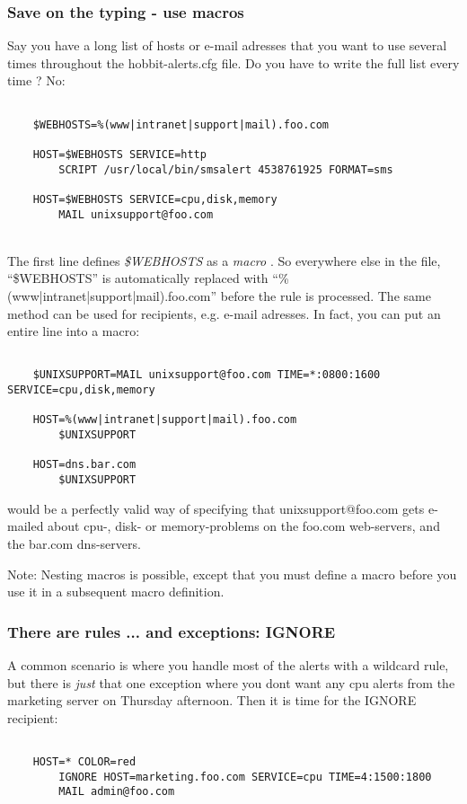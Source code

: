 \subsubsection*{Save on the typing - use macros}


 Say you have a long list of hosts or e-mail adresses that you want to use several times throughout the hobbit-alerts.cfg file. Do you have to write the full list every time ? No:\\ 
\begin{verbatim}

	$WEBHOSTS=%(www|intranet|support|mail).foo.com 
	
	HOST=$WEBHOSTS SERVICE=http
		SCRIPT /usr/local/bin/smsalert 4538761925 FORMAT=sms

	HOST=$WEBHOSTS SERVICE=cpu,disk,memory
		MAIL unixsupport@foo.com

\end{verbatim}
\\ 
 The first line defines \emph{\$WEBHOSTS}
 as a \emph{macro}
. So everywhere else in the file, ``\$WEBHOSTS'' is automatically replaced with ``\%(www|intranet|support|mail).foo.com'' before the rule is processed. The same method can be used for recipients, e.g. e-mail adresses. In fact, you can put an entire line into a macro:\\ 
\begin{verbatim}

	$UNIXSUPPORT=MAIL unixsupport@foo.com TIME=*:0800:1600 SERVICE=cpu,disk,memory

	HOST=%(www|intranet|support|mail).foo.com 
		$UNIXSUPPORT

	HOST=dns.bar.com
		$UNIXSUPPORT

\end{verbatim}



 would be a perfectly valid way of specifying that unixsupport@foo.com gets e-mailed about cpu-, disk- or memory-problems on the foo.com web-servers, and the bar.com dns-servers.


 Note: Nesting macros is possible, except that you must define a macro before you use it in a subsequent macro definition.
\subsubsection*{There are rules ... and exceptions: IGNORE}


 A common scenario is where you handle most of the alerts with a wildcard rule, but there is \emph{just}
 that one exception where you dont want any cpu alerts from the marketing server on Thursday afternoon. Then it is time for the IGNORE recipient:\\ 
\begin{verbatim}

	HOST=* COLOR=red
		IGNORE HOST=marketing.foo.com SERVICE=cpu TIME=4:1500:1800
		MAIL admin@foo.com

\end{verbatim}



